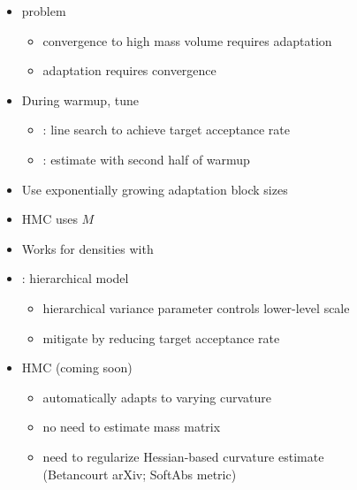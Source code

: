 \documentclass[10pt]{report}
\newcommand{\sld}[1]{\newpage{\noindent\LARGE \ \ \
    \textcolor{MidnightBlue}{\bfseries #1}}\vspace*{4pt}}
\newcommand{\myemph}[1]{{\color{MidnightBlue}{\bfseries #1}}}
\begin{document}
\begin{itemize}
\item \myemph{Chicken-and-egg} problem
\vspace*{-4pt}
\begin{itemize}\small
\item convergence to high mass volume requires adaptation 
\item adaptation requires convergence
\end{itemize}
\item During warmup, tune
\vspace*{-4pt}
\begin{itemize}\small
\item \myemph{step size}: line search to achieve target acceptance
  rate
\item \myemph{mass matrix}: estimate with second half of warmup
\end{itemize}
\item Use exponentially growing adaptation block sizes
\end{itemize}

\sld{Position-Independent Curvature}

\begin{itemize}
\item \myemph{Euclidean} HMC uses \myemph{global mass matrix} $M$
\item Works for densities with \myemph{position-independent curvature}
\item \myemph{Counterexample}: hierarchical model
\vspace*{-4pt}
\begin{itemize}\small
\item hierarchical variance parameter controls lower-level scale
\item mitigate by reducing target acceptance rate
\end{itemize}
\vfill
\item \myemph{Riemannian-manifold} HMC (coming soon)
\vspace*{-4pt}
\begin{itemize}\small
\item automatically adapts to varying curvature
\item no need to estimate mass matrix
\item need to regularize Hessian-based curvature estimate
\\ {\footnotesize (Betancourt arXiv; SoftAbs metric)}
\end{itemize}
\end{itemize}
\end{document}
